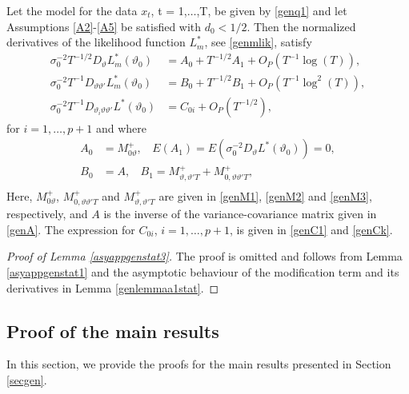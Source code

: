 {{\begin{lemma} \label{asyappgenstat3}
Let the model for the data $x_t$, t = 1,$\ldots$,T, be given by \eqref{genq1} and let Assumptions \ref{A2}-\ref{A5} be satisfied with $d_0 < 1/2$. Then the normalized derivatives of the likelihood function $L_m^*$, see \eqref{genmlik}, satisfy
\begin{align}
    \sigma_0^{-2} T^{-1/2} D_{\vartheta} L_m^*(\vartheta_0)  &= A_{0} + T^{-1/2} A_{1} +O_P(T^{-1} \log(T)), \\
    \sigma_0^{-2} T^{-1} D_{\vartheta \vartheta'} L_m^*(\vartheta_0)  &= B_{0} + T^{-1/2}  B_{1} + O_P(T^{-1} \log^2(T) ), \\
     \sigma_0^{-2} T^{-1} D_{\vartheta_i \vartheta \vartheta'} L^*(\vartheta_0)  &= C_{0i} + O_P(T^{-1/2}), 
\end{align}
for $i = 1,\ldots,p+1$ and where
\begin{align*}
A_{0} &= M_{0\vartheta}^{+}, \ \ \ \ E(A_{1}) = E(\sigma^{-2}_0 D_{\vartheta} L^*(\vartheta_0) ) = 0, \\
B_{0} &= A, \ \ \ \ B_1 = M_{\vartheta,\vartheta' T}^{+} + M_{0,\vartheta \vartheta' T}^{+}, \\
\end{align*}
Here,
$M_{0\vartheta}^{+}$, $M_{0,\vartheta \vartheta' T}^{+}$ and $M_{\vartheta,\vartheta' T}^{+}$ are given in \eqref{genM1}, \eqref{genM2} and \eqref{genM3}, respectively,
and $A$ is the inverse of the variance-covariance matrix given in \eqref{genA}. The expression for $C_{0i}$, $i = 1,\ldots,p+1$, is given in \eqref{genC1} and \eqref{genCk}. 
\end{lemma}

\begin{proof}[Proof of Lemma \ref{asyappgenstat3}]
The proof is omitted and follows from Lemma  \ref{asyappgenstat1} and the asymptotic behaviour of the modification term and its derivatives in Lemma \ref{genlemmaa1stat}. 
\end{proof}





\subsection{Proof of the main results} \label{generalizationsappendix}

In this section, we provide the proofs for the main results presented in Section \ref{secgen}.









}}

